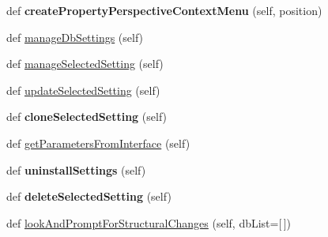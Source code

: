 \begin{DoxyCompactItemize}
def {\bfseries create\+Property\+Perspective\+Context\+Menu} (self, position)
\item 
def \mbox{\hyperlink{class_dsg_tools_1_1_custom_widgets_1_1generic_manager_widget_1_1_generic_manager_widget_a0e4887cc182ef03c39f817b816454c54}{manage\+Db\+Settings}} (self)
\item 
def \mbox{\hyperlink{class_dsg_tools_1_1_custom_widgets_1_1generic_manager_widget_1_1_generic_manager_widget_a7af0523f8b2ce717d4ae13400d8e3046}{manage\+Selected\+Setting}} (self)
\item 
def \mbox{\hyperlink{class_dsg_tools_1_1_custom_widgets_1_1generic_manager_widget_1_1_generic_manager_widget_a89b9e70f470c910e1edae2f8e3e4f28e}{update\+Selected\+Setting}} (self)
\item 
\mbox{\label{class_dsg_tools_1_1_custom_widgets_1_1generic_manager_widget_1_1_generic_manager_widget_a8ca5d4254bc9620c10cdbd3d938a7f43}} 
def {\bfseries clone\+Selected\+Setting} (self)
\item 
def \mbox{\hyperlink{class_dsg_tools_1_1_custom_widgets_1_1generic_manager_widget_1_1_generic_manager_widget_a18683865cebe8c6817089f211b2c112d}{get\+Parameters\+From\+Interface}} (self)
\item 
\mbox{\label{class_dsg_tools_1_1_custom_widgets_1_1generic_manager_widget_1_1_generic_manager_widget_abad9ff802caec5dca53d80a0534a1e46}} 
def {\bfseries uninstall\+Settings} (self)
\item 
\mbox{\label{class_dsg_tools_1_1_custom_widgets_1_1generic_manager_widget_1_1_generic_manager_widget_a26dcf6e0ae87d92d22f334df3d86630f}} 
def {\bfseries delete\+Selected\+Setting} (self)
\item 
def \mbox{\hyperlink{class_dsg_tools_1_1_custom_widgets_1_1generic_manager_widget_1_1_generic_manager_widget_a3bb4d16fe5ae62ccab8e64058c99bbb2}{look\+And\+Prompt\+For\+Structural\+Changes}} (self, db\+List=\mbox{[}$\,$\mbox{]})
\end{DoxyCompactItemize}
